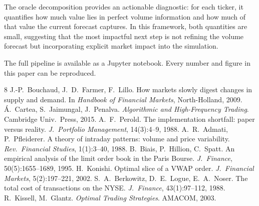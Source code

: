 \documentclass[10pt,twocolumn]{article}
\begin{document}
The oracle decomposition provides an actionable diagnostic: for each ticker, it quantifies how much value lies in perfect volume information and how much of that value the current forecast captures. In this framework, both quantities are small, suggesting that the most impactful next step is not refining the volume forecast but incorporating explicit market impact into the simulation.

The full pipeline is available as a Jupyter notebook. Every number and figure in this paper can be reproduced.

\begin{thebibliography}{8}
 J.-P.~Bouchaud, J.~D.~Farmer, F.~Lillo. How markets slowly digest changes in supply and demand. In \textit{Handbook of Financial Markets}, North-Holland, 2009.
 \'A.~Cartea, S.~Jaimungal, J.~Penalva. \textit{Algorithmic and High-Frequency Trading}. Cambridge Univ.\ Press, 2015.
 A.~F.~Perold. The implementation shortfall: paper versus reality. \textit{J.\ Portfolio Management}, 14(3):4--9, 1988.
 A.~R.~Admati, P.~Pfleiderer. A theory of intraday patterns: volume and price variability. \textit{Rev.\ Financial Studies}, 1(1):3--40, 1988.
 B.~Biais, P.~Hillion, C.~Spatt. An empirical analysis of the limit order book in the Paris Bourse. \textit{J.\ Finance}, 50(5):1655--1689, 1995.
 H.~Konishi. Optimal slice of a VWAP order. \textit{J.\ Financial Markets}, 5(2):197--221, 2002.
 S.~A.~Berkowitz, D.~E.~Logue, E.~A.~Noser. The total cost of transactions on the NYSE. \textit{J.\ Finance}, 43(1):97--112, 1988.
 R.~Kissell, M.~Glantz. \textit{Optimal Trading Strategies}. AMACOM, 2003.
\end{thebibliography}
\end{document}

